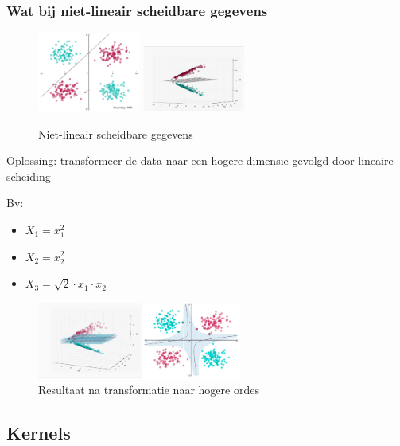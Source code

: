 \documentclass{article}
\begin{document}
\subsubsection{Wat bij niet-lineair scheidbare gegevens}

\begin{figure}[H]
    \centering
    \includegraphics[width=0.3\textwidth]{svm-niet-lineair.png}
    \includegraphics[width=0.3\textwidth]{svm-niet-lineair2.png}
    \caption{Niet-lineair scheidbare gegevens}
\end{figure}

Oplossing: transformeer de data naar een hogere dimensie gevolgd door lineaire scheiding

Bv:

\begin{itemize}
    \item $X_1 = x_1^2$
    \item $X_2 = x_2^2$
    \item $X_3= \sqrt{2}\cdot x_1 \cdot x_2$
\end{itemize}


\begin{figure}[H]
    \centering
    \includegraphics[width=0.6\textwidth]{svm-niet-lineair3.png}
    \caption{Resultaat na transformatie naar hogere ordes}
\end{figure}

\subsection{Kernels}
\end{document}
